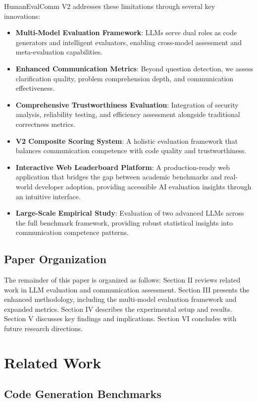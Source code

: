 \documentclass[conference]{IEEEtran}
\begin{document}
HumanEvalComm V2 addresses these limitations through several key innovations:

\begin{itemize}
    \item \textbf{Multi-Model Evaluation Framework}: LLMs serve dual roles as code generators and intelligent evaluators, enabling cross-model assessment and meta-evaluation capabilities.
    \item \textbf{Enhanced Communication Metrics}: Beyond question detection, we assess clarification quality, problem comprehension depth, and communication effectiveness.
    \item \textbf{Comprehensive Trustworthiness Evaluation}: Integration of security analysis, reliability testing, and efficiency assessment alongside traditional correctness metrics.
    \item \textbf{V2 Composite Scoring System}: A holistic evaluation framework that balances communication competence with code quality and trustworthiness.
    \item \textbf{Interactive Web Leaderboard Platform}: A production-ready web application that bridges the gap between academic benchmarks and real-world developer adoption, providing accessible AI evaluation insights through an intuitive interface.
    \item \textbf{Large-Scale Empirical Study}: Evaluation of two advanced LLMs across the full benchmark framework, providing robust statistical insights into communication competence patterns.
\end{itemize}

\subsection{Paper Organization}

The remainder of this paper is organized as follows: Section II reviews related work in LLM evaluation and communication assessment. Section III presents the enhanced methodology, including the multi-model evaluation framework and expanded metrics. Section IV describes the experimental setup and results. Section V discusses key findings and implications. Section VI concludes with future research directions.

\section{Related Work}

\subsection{Code Generation Benchmarks}
\end{document}
